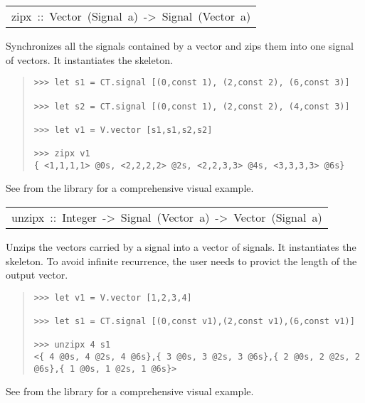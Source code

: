 \begin{haddockdesc}
\item[\begin{tabular}{@{}l}
zipx\ ::\ Vector\ (Signal\ a)\ ->\ Signal\ (Vector\ a)
\end{tabular}]\haddockbegindoc
Synchronizes all the signals contained by a vector and zips them
 into one signal of vectors. It instantiates the
  skeleton.\par
\begin{quote}
{\haddockverb\begin{verbatim}
>>> let s1 = CT.signal [(0,const 1), (2,const 2), (6,const 3)]

>>> let s2 = CT.signal [(0,const 1), (2,const 2), (4,const 3)]

>>> let v1 = V.vector [s1,s1,s2,s2]

>>> zipx v1
{ <1,1,1,1> @0s, <2,2,2,2> @2s, <2,2,3,3> @4s, <3,3,3,3> @6s}

\end{verbatim}}
\end{quote}See  from the 
 library for a comprehensive visual example.\par
           
\end{haddockdesc}
\begin{haddockdesc}
\item[\begin{tabular}{@{}l}
unzipx\ ::\ Integer\ ->\ Signal\ (Vector\ a)\ ->\ Vector\ (Signal\ a)
\end{tabular}]\haddockbegindoc
Unzips the vectors carried by a signal into a vector of
 signals. It instantiates the 
 skeleton. To avoid infinite recurrence, the user needs to provict
 the length of the output vector.\par
\begin{quote}
{\haddockverb\begin{verbatim}
>>> let v1 = V.vector [1,2,3,4]

>>> let s1 = CT.signal [(0,const v1),(2,const v1),(6,const v1)]

>>> unzipx 4 s1
<{ 4 @0s, 4 @2s, 4 @6s},{ 3 @0s, 3 @2s, 3 @6s},{ 2 @0s, 2 @2s, 2 @6s},{ 1 @0s, 1 @2s, 1 @6s}>

\end{verbatim}}
\end{quote}See  from the 
 library for a comprehensive visual example.\par
           
\end{haddockdesc}
